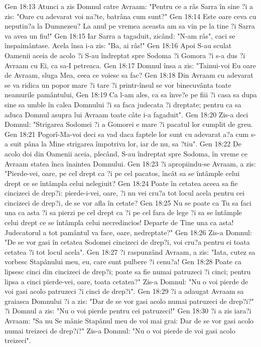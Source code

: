 Gen 18:13  Atunci a zis Domnul catre Avraam: "Pentru ce a râs Sarra în sine ?i a zis: "Oare cu adevarat voi na?te, batrâna cum sunt?"
Gen 18:14  Este oare ceva cu neputin?a la Dumnezeu? La anul pe vremea aceasta am sa vin pe la tine ?i Sarra va avea un fiu!"
Gen 18:15  Iar Sarra a tagaduit, zicând: "N-am râs", caci se înspaimântase. Acela însa i-a zis: "Ba, ai râs!"
Gen 18:16  Apoi S-au sculat Oamenii aceia de acolo ?i S-au îndreptat spre Sodoma ?i Gomora ?i s-a dus ?i Avraam cu Ei, ca sa-I petreaca.
Gen 18:17  Domnul însa a zis: "Tainui-voi Eu oare de Avraam, sluga Mea, ceea ce voiesc sa fac?
Gen 18:18  Din Avraam cu adevarat se va ridica un popor mare ?i tare ?i printr-însul se vor binecuvânta toate neamurile pamântului,
Gen 18:19  Ca l-am ales, ca sa înve?e pe fiii ?i casa sa dupa sine sa umble în calea Domnului ?i sa faca judecata ?i dreptate; pentru ca sa aduca Domnul asupra lui Avraam toate câte i-a fagaduit".
Gen 18:20  Zis-a deci Domnul: "Strigarea Sodomei ?i a Gomorei e mare ?i pacatul lor cumplit de greu.
Gen 18:21  Pogorî-Ma-voi deci sa vad daca faptele lor sunt cu adevarat a?a cum s-a suit pâna la Mine strigarea împotriva lor, iar de nu, sa ?tiu".
Gen 18:22  De acolo doi din Oamenii aceia, plecând, S-au îndreptat spre Sodoma, în vreme ce Avraam statea înca înaintea Domnului.
Gen 18:23  ?i apropiindu-se Avraam, a zis: "Pierde-vei, oare, pe cel drept ca ?i pe cel pacatos, încât sa se întâmple celui drept ce se întâmpla celui nelegiuit?
Gen 18:24  Poate în cetatea aceea sa fie cincizeci de drep?i: pierde-i-vei, oare, ?i nu vei cru?a tot locul acela pentru cei cincizeci de drep?i, de se vor afla în cetate?
Gen 18:25  Nu se poate ca Tu sa faci una ca asta ?i sa pierzi pe cel drept ca ?i pe cel fara de lege ?i sa se întâmple celui drept ce se întâmpla celui necredincios! Departe de Tine una ca asta! Judecatorul a tot pamântul va face, oare, nedreptate?"
Gen 18:26  Zis-a Domnul: "De se vor gasi în cetatea Sodomei cincizeci de drep?i, voi cru?a pentru ei toata cetatea ?i tot locul acela".
Gen 18:27  ?i raspunzând Avraam, a zis: "Iata, cutez sa vorbesc Stapânului meu, eu, care sunt pulbere ?i cenu?a!
Gen 18:28  Poate ca lipsesc cinci din cincizeci de drep?i; poate sa fie numai patruzeci ?i cinci; pentru lipsa a cinci pierde-vei, oare, toata cetatea?" Zis-a Domnul: "Nu o voi pierde de voi gasi acolo patruzeci ?i cinci de drep?i".
Gen 18:29  ?i a adaugat Avraam sa graiasca Domnului ?i a zis: "Dar de se vor gasi acolo numai patruzeci de drep?i?" ?i Domnul a zis: "Nu o voi pierde pentru cei patruzeci!"
Gen 18:30  ?i a zis iara?i Avraam: "Sa nu Se mânie Stapânul meu de voi mai grai: Dar de se vor gasi acolo numai treizeci de drep?i?" Zis-a Domnul: "Nu o voi pierde de voi gasi acolo treizeci".
